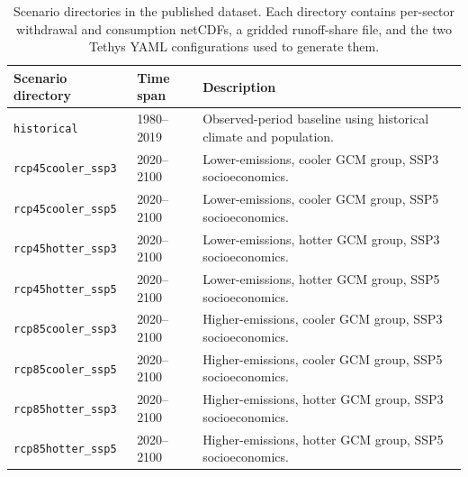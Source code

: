 \documentclass[fleqn,10pt]{wlscirep}
\begin{document}
\begin{table}[!ht]
\centering
\begin{tabular}{lll}
\toprule
\textbf{Scenario directory} & \textbf{Time span} & \textbf{Description} \\
\midrule
\texttt{historical}         & 1980--2019 & Observed-period baseline using historical climate and population. \\
\texttt{rcp45cooler\_ssp3}  & 2020--2100 & Lower-emissions, cooler GCM group, SSP3 socioeconomics. \\
\texttt{rcp45cooler\_ssp5}  & 2020--2100 & Lower-emissions, cooler GCM group, SSP5 socioeconomics. \\
\texttt{rcp45hotter\_ssp3}  & 2020--2100 & Lower-emissions, hotter GCM group, SSP3 socioeconomics. \\
\texttt{rcp45hotter\_ssp5}  & 2020--2100 & Lower-emissions, hotter GCM group, SSP5 socioeconomics. \\
\texttt{rcp85cooler\_ssp3}  & 2020--2100 & Higher-emissions, cooler GCM group, SSP3 socioeconomics. \\
\texttt{rcp85cooler\_ssp5}  & 2020--2100 & Higher-emissions, cooler GCM group, SSP5 socioeconomics. \\
\texttt{rcp85hotter\_ssp3}  & 2020--2100 & Higher-emissions, hotter GCM group, SSP3 socioeconomics. \\
\texttt{rcp85hotter\_ssp5}  & 2020--2100 & Higher-emissions, hotter GCM group, SSP5 socioeconomics. \\
\bottomrule
\end{tabular}
\caption{Scenario directories in the published dataset. Each directory contains per-sector withdrawal and consumption netCDFs, a gridded runoff-share file, and the two Tethys YAML configurations used to generate them.}
\label{tab:scenarios}
\end{table}

\end{document}
